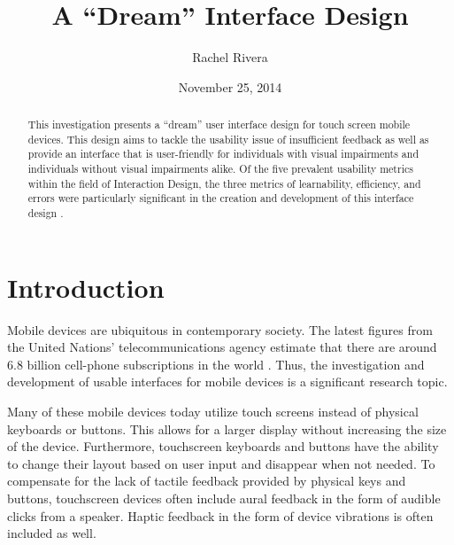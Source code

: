 \documentclass[11pt]{article}
\title{A ``Dream'' Interface Design}
\author{Rachel Rivera}
\date{November 25, 2014}
\begin{document}
\maketitle


\begin{abstract}
This investigation presents a ``dream'' user interface design for touch screen mobile devices. This design aims to tackle the usability issue of insufficient feedback as well as provide an interface that is user-friendly for individuals with visual impairments and individuals without visual impairments alike. Of the five prevalent usability metrics within the field of Interaction Design, the three metrics of learnability, efficiency, and errors were particularly significant in the creation and development of this interface design \cite{Nielsen:1993:UE:529793}.
\end{abstract}


\pagebreak
\tableofcontents



\pagebreak


\section{Introduction}
\label{Introduction}

Mobile devices are ubiquitous in contemporary society. The latest figures from the United Nations' telecommunications agency estimate that there are around 6.8 billion cell-phone subscriptions in the world \cite{UNTelecommunications	}. Thus, the investigation and development of usable interfaces for mobile devices is a significant research topic.

Many of these mobile devices today utilize touch screens instead of physical keyboards or buttons. This allows for a larger display without increasing the size of the device. Furthermore, touchscreen keyboards and buttons have the ability to change their layout based on user input and disappear when not needed. To compensate for the lack of tactile feedback provided by physical keys and buttons, touchscreen devices often include aural feedback in the form of audible clicks from a speaker. Haptic feedback in the form of device vibrations is often included as well.
\end{document}
